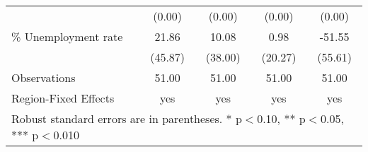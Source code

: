 \begin{table}[!htbp]
\begin{tabular}{l*{4}{c}}
                    &      (0.00)   &      (0.00)   &      (0.00)   &      (0.00)   \\
\% Unemployment rate&       21.86   &       10.08   &        0.98   &      -51.55   \\
                    &     (45.87)   &     (38.00)   &     (20.27)   &     (55.61)   \\
\hline
Observations        &       51.00   &       51.00   &       51.00   &       51.00   \\
Region-Fixed Effects&         yes   &         yes   &         yes   &         yes   \\
\hline\hline
\multicolumn{5}{p{\linewidth}}{\footnotesize Robust standard errors are in parentheses. * p$<$0.10, ** p$<$0.05, *** p$<$0.010}\\
\end{tabular}
\end{table}
